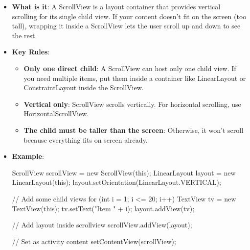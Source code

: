 \documentclass{report}
\begin{document}
    \begin{itemize}
       \item \textbf{What is it}: A ScrollView is a layout container that provides vertical scrolling for its single child view. 
           \bigbreak \noindent 
           If your content doesn’t fit on the screen (too tall), wrapping it inside a ScrollView lets the user scroll up and down to see the rest.
        \item \textbf{Key Rules}:
            \begin{itemize}
                \item \textbf{Only one direct child}:	A ScrollView can host only one child view. If you need multiple items, put them inside a container like LinearLayout or ConstraintLayout inside the ScrollView.
                \item \textbf{Vertical only}:	ScrollView scrolls vertically. For horizontal scrolling, use HorizontalScrollView.
                \item \textbf{The child must be taller than the screen}: Otherwise, it won’t scroll because everything fits on screen already.
            \end{itemize}
        \item \textbf{Example}:
            \bigbreak \noindent 
            \begin{javacode}
                ScrollView scrollView = new ScrollView(this);
                LinearLayout layout = new LinearLayout(this);
                layout.setOrientation(LinearLayout.VERTICAL);

                // Add some child views
                for (int i = 1; i <= 20; i++) {
                    TextView tv = new TextView(this);
                    tv.setText("Item " + i);
                    layout.addView(tv);
                }

                // Add layout inside scrollview
                scrollView.addView(layout);

                // Set as activity content
                setContentView(scrollView);


\end{javacode}
\end{itemize}
\end{document}

